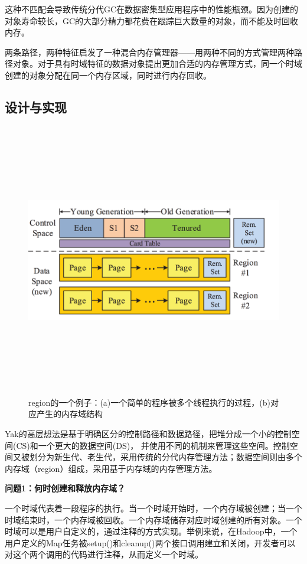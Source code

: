 这种不匹配会导致传统分代GC在数据密集型应用程序中的性能瓶颈。因为创建的对象寿命较长，GC的大部分精力都花费在跟踪巨大数量的对象，而不能及时回收内存。 

两条路径，两种特征启发了一种混合内存管理器——用两种不同的方式管理两种路径对象。对于具有时域特征的数据对象提出更加合适的内存管理方式，同一个时域创建的对象分配在同一个内存区域，同时进行内存回收。

\subsection{设计与实现}
\begin{figure}[h]
    \centering
    \includegraphics[width=12cm,height=12cm]{figure/layout.png}
    \caption{
        region的一个例子：(a)一个简单的程序被多个线程执行的过程，(b)对应产生的内存域结构
    }
    \label{img3}
\end{figure}
Yak的高层想法是基于明确区分的控制路径和数据路径，把堆分成一个小的控制空间(CS)和一个更大的数据空间(DS)， 并使用不同的机制来管理这些空间。控制空间又被划分为新生代、老生代，采用传统的分代内存管理方法；数据空间则由多个内存域（region）组成，采用基于内存域的内存管理方法。

{\bfseries 问题1：何时创建和释放内存域？}

一个时域代表着一段程序的执行。当一个时域开始时，一个内存域被创建；当一个时域结束时，一个内存域被回收。一个内存域储存对应时域创建的所有对象。一个时域可以是用户自定义的，通过注释的方式实现。举例来说，在Hadoop中，一个用户定义的Map任务被setup()和cleanup()两个接口调用建立和关闭，开发者可以对这个两个调用的代码进行注释，从而定义一个时域。

